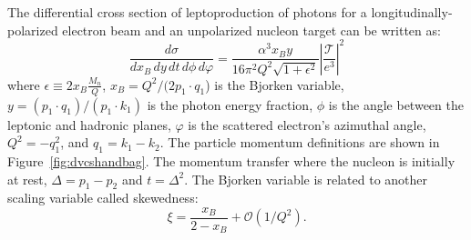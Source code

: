 The differential cross section of leptoproduction of photons for a 
longitudinally-polarized electron beam and an unpolarized nucleon target can 
be written as:
\begin{equation}
\frac{d\sigma}{dx_B\,dy\,dt\,d\phi\,d\varphi} = \frac{\alpha^3 x_B y}{16 \pi^2 
   Q^2 \sqrt{1+\epsilon^2}} \left| \frac{\mathcal{T}}{e^3} \right|^2
\end{equation}
where $\epsilon \equiv 2x_B \frac{M_n}{Q}$, $x_B=Q^2/(2p_1\cdot q_1$) is the 
Bjorken variable, $y= (p_1\cdot q_1)/(p_1\cdot k_1)$ is the photon energy 
fraction, $\phi$ is the angle between the leptonic and hadronic planes, 
$\varphi$ is the scattered electron's azimuthal angle, $Q^2= -q_1^2$, and 
$q_1=k_1-k_2$. The particle momentum definitions are shown in 
Figure~\ref{fig:dvcshandbag}. The momentum transfer where the nucleon is 
initially at rest, $\Delta = p_1-p_2$ and $t=\Delta^2$. The Bjorken variable  
is related to another scaling variable called skewedness:
\begin{equation}
\xi = \frac{x_B}{2 - x_B} + \mathcal{O}(1/Q^2).
\end{equation}


